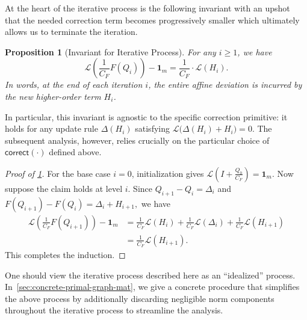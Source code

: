\documentclass[12pt]{article}
\def\1{\bm{1}}
\newtheorem{proposition}[theorem]{Proposition}
\newcommand{\corr}{\mathsf{correct}}
\newcommand{\calL}{\mathcal{L}}
\newcommand{\Authornote}[3]{{\sf\footnotesize\color{#3}{[#1: #2]}}}
\newcommand{\Authornote}[3]{}
\newcommand{\jnote}[1]{\Authornote{Jeff}{#1}{blue}}
\newcommand{\snote}[1]{\Authornote{Sofia}{#1}{orange}}
\begin{document}
At the heart of the iterative process is the following invariant with an upshot that the needed correction term becomes progressively smaller which %
ultimately allows us to terminate the iteration.%

\begin{proposition}[Invariant for Iterative Process] \label{prop:invariant-primal}
	For any $i \ge 1$, we have
	\[
 \calL( \frac{1}{C_F } F(Q_i) )  - \1_m = \frac{1}{C_F} \cdot  \calL(H_{i}).
\]
In words, at the end of each iteration $i$, the entire affine deviation is incurred by the new
higher-order term \(H_{i}\).
\end{proposition}
In particular, this invariant is agnostic to the specific correction primitive: it holds for any update rule \(\Delta(H_i)\) satisfying
\(
    \calL\bigl(\Delta(H_i)+H_i\bigr)=0.
\)
The subsequent analysis, however, relies crucially on the particular choice of \(\corr(\cdot )\) defined above.

\begin{proof}[Proof of \cref{prop:invariant-primal}]

For the base case $i=0$, initialization gives
\(
    \calL\!\left(I+\frac{Q_0}{C_F}\right)=\1_m.
\)
%
Now suppose the claim holds at level \(i\). Since
\(
    Q_{i+1}-Q_i=\Delta_i
\)
and
\(
    F(Q_{i+1})-F(Q_i)=\Delta_i+H_{i+1},
\)
we have
\[
\begin{aligned}
    \calL\!\left(\frac{1}{C_F}F(Q_{i+1})\right)-\1_m
    &=
    \frac{1}{C_F}\calL(H_i)
    +\frac{1}{C_F}\calL(\Delta_i)
    +\frac{1}{C_F}\calL(H_{i+1})\\
    &=
    \frac{1}{C_F}\calL(H_{i+1}).
\end{aligned}
\]
This completes the induction.
\end{proof}

One should view the iterative process described here as an ``idealized'' process. In~\cref{sec:concrete-primal-graph-mat}, we give a concrete procedure that simplifies the above process by additionally discarding negligible norm components throughout the iterative process to streamline the analysis.
\end{document}
